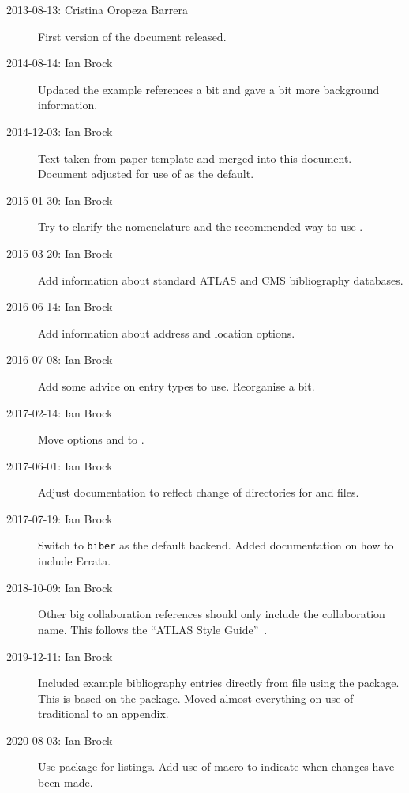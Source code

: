 \documentclass[UKenglish, texlive=2016]{atlasdoc}
\begin{document}
\begin{description}
\item[2013-08-13: Cristina Oropeza Barrera] First version of the document released.
\item[2014-08-14: Ian Brock] Updated the example references a bit and gave a bit more background information.
\item[2014-12-03: Ian Brock] Text taken from paper template and merged into this document.
  Document adjusted for use of  as the default.
\item[2015-01-30: Ian Brock] Try to clarify the nomenclature and
  the recommended way to use \BibTeX.
\item[2015-03-20: Ian Brock] Add information about standard ATLAS and CMS bibliography databases.
\item[2016-06-14: Ian Brock] Add information about address and location options.
\item[2016-07-08: Ian Brock] Add some advice on entry types to use. Reorganise a bit.
\item[2017-02-14: Ian Brock] Move options  and  to .
\item[2017-06-01: Ian Brock] Adjust documentation to reflect change of directories for  and  files.
\item[2017-07-19: Ian Brock] Switch to \texttt{biber} as the default  backend.
  Added documentation on how to include Errata.
\item[2018-10-09: Ian Brock] Other big collaboration references should only include the collaboration name.
  This follows the \enquote{ATLAS Style Guide}~\cite{atlas-style}.
\item[2019-12-11: Ian Brock] Included example bibliography entries directly from  file using the  package.
  This is based on the  package.
  Moved almost everything on use of traditional \BibTeX to an appendix.
\item[2020-08-03: Ian Brock] Use  package for listings.
  Add use of  macro to indicate when changes have been made.
\end{description}
\end{document}

